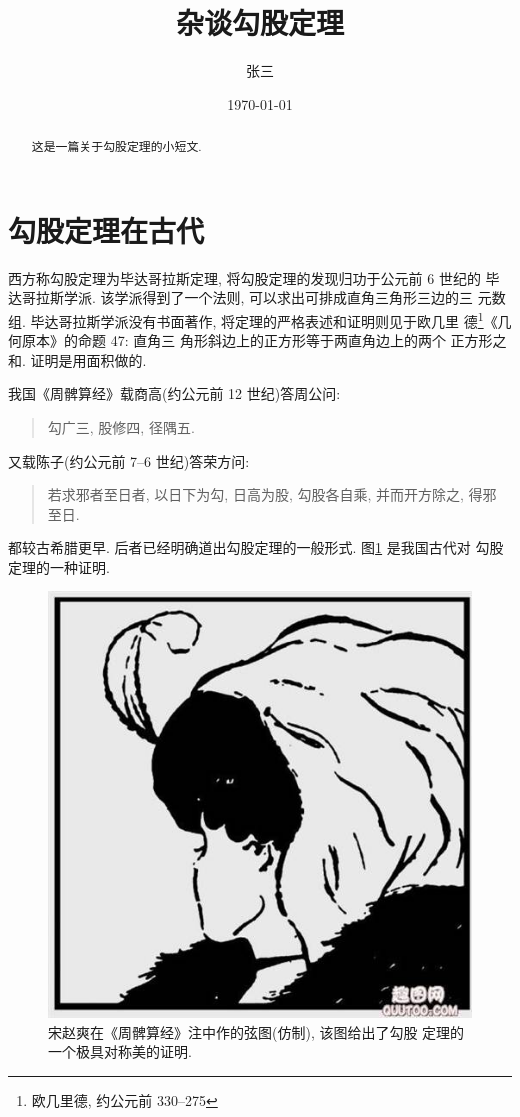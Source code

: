 \documentclass[nofonts]{ctexart}
\title{杂谈勾股定理}
\author{张三}
\date{\today}
\begin{document}
\maketitle

\begin{abstract}
	这是一篇关于勾股定理的小短文.
\end{abstract}

\tableofcontents
\section{勾股定理在古代}\label{se:oldage}
西方称勾股定理为毕达哥拉斯定理, 将勾股定理的发现归功于公元前 6 世纪的
毕达哥拉斯学派\cite{Kline}. 该学派得到了一个法则, 可以求出可排成直角三角形三边的三
元数组. 毕达哥拉斯学派没有书面著作, 将定理的严格表述和证明则见于欧几里
德\footnote{欧几里德, 约公元前 330--275}《几何原本》的命题 47: 直角三
角形斜边上的正方形等于两直角边上的两个
正方形之和. 证明是用面积做的.

我国《周髀算经》载商高(约公元前 12 世纪)答周公问:
\begin{quote}
	 勾广三, 股修四, 径隅五.
\end{quote}
又载陈子(约公元前 7--6 世纪)答荣方问:

\begin{quote}
若求邪者至日者, 以日下为勾, 日高为股, 勾股各自乘, 并而开方除之, 得邪
至日.
\end{quote}

都较古希腊更早. 后者已经明确道出勾股定理的一般形式. 图\ref{fig:xiantu}
是我国古代对 勾股定理的一种证明\cite{quanjing}.
\begin{figure}[h]
	\centering
	\includegraphics[scale=0.3]{lady.jpg}
	\caption{宋赵爽在《周髀算经》注中作的弦图(仿制), 该图给出了勾股
	定理的一个极具对称美的证明.}
	\label{fig:xiantu}
\end{figure}
\end{document}
